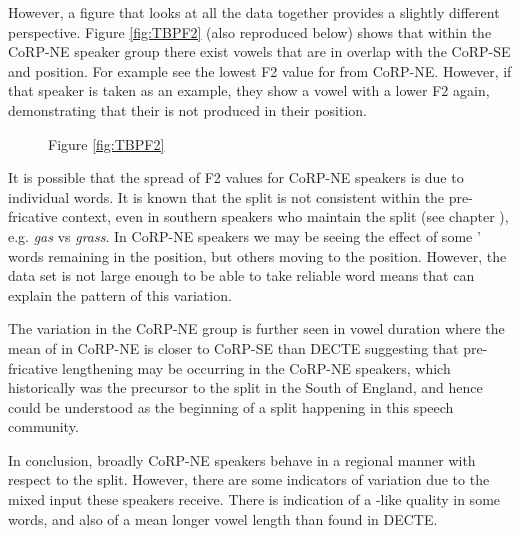 \documentclass[../../00.FullDoc/tex/Thesis]{subfiles}
\begin{document}
However, a figure that looks at all the data together provides a slightly different perspective. Figure \ref{fig:TBPF2} (also reproduced below) shows that within the CoRP-NE speaker group there exist \bath{} vowels that are in overlap with the CoRP-SE \bath{} and \palm{} position. For example see the lowest F2 value for \bath{} from CoRP-NE. However, if that speaker is taken as an example, they show a \palm{} vowel with a lower F2 again, demonstrating that their \bath{} is not produced in their \palm{} position.

\begin{figure}[h]
	
	Figure \ref{fig:TBPF2}
\end{figure}

It is possible that the spread of F2 values for CoRP-NE speakers is due to individual words. It is known that the \TB{} split is not consistent within the pre-fricative context, even in southern speakers who maintain the split (see chapter \notinsubfile{\ref{ch:LitReviewSocio}} ), e.g. \textit{gas} vs \textit{grass}. In CoRP-NE speakers we may be seeing the effect of some '\quotesingle{\bath{}} words remaining in the \trap{} position, but others moving to the \palm{} position. However, the data set is not large enough to be able to take reliable word means that can explain the pattern of this variation.

The variation in the CoRP-NE group is further seen in vowel duration where the mean of \bath{} in CoRP-NE is closer to CoRP-SE than DECTE suggesting that pre-fricative lengthening may be occurring in the CoRP-NE speakers, which historically was the precursor to the split in the South of England, and hence could be understood as the beginning of a split happening in this speech community.

In conclusion, broadly CoRP-NE speakers behave in a regional manner with respect to the \TB{} split. However, there are some indicators of variation due to the mixed input these speakers receive. There is indication of a \palm{}-like quality in some words, and also of a mean longer vowel length than found in DECTE.







	
	
	
	
	
	 
	\pagebreak
	
	
	
\end{document}
